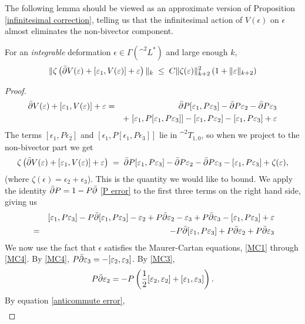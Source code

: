 \documentclass{article}
\begin{document}
The following lemma should be viewed as an approximate version of Proposition \ref{infinitesimal correction}, telling us that the infinitesimal action of $V(\epsilon)$ on $\epsilon$ almost eliminates the non-bivector component.
\begin{lem}\label{almost infinitesimal}
For an \emph{integrable} deformation $\epsilon \in \Gamma(\^ ^2 L^*)$ and large enough $k$,
$$\|\zeta\left(\bar{\partial} V(\varepsilon) + [\varepsilon_1,V(\varepsilon)] + \varepsilon\right)\|_k \;\leq\; C \|\zeta(\varepsilon)\|_{k+2}^2 \, (1 + \|\varepsilon\|_{k+2})$$
\end{lem}
\begin{proof}
\begin{eqnarray*}
\bar{\partial} V(\varepsilon) + [\varepsilon_1,V(\varepsilon)] + \varepsilon &=&
\bar{\partial} P[\varepsilon_1,P\varepsilon_3] - \bar{\partial} P\varepsilon_2 - \bar{\partial} P\varepsilon_3 \\
& & +\; [\varepsilon_1,P[\varepsilon_1,P\varepsilon_3]] - [\varepsilon_1,P\varepsilon_2] - [\varepsilon_1,P\varepsilon_3] + \varepsilon
\end{eqnarray*}
The terms $[\epsilon_1,P\epsilon_2]$ and $[\epsilon_1,P[\epsilon_1,P\epsilon_3]]$ lie in $\^ ^2 T_{1,0}$, so when we project to the non-bivector part we get
$$\zeta\left(\bar{\partial} V(\varepsilon) + [\varepsilon_1,V(\varepsilon)] + \varepsilon\right) \;=\;
\bar{\partial} P[\varepsilon_1,P\varepsilon_3] - \bar{\partial} P\varepsilon_2 - \bar{\partial} P\varepsilon_3
- [\varepsilon_1,P\varepsilon_3] + \zeta(\varepsilon),$$
(where $\zeta(\epsilon) = \epsilon_2 + \epsilon_3$).  This is the quantity we would like to bound.  We apply the identity $\bar{\partial} P = 1 - P \bar{\partial}$ \eqref{P error} to the first three terms on the right hand side, giving us
\begin{eqnarray}
& & [\epsilon_1,P\epsilon_3] - P\bar\del[\epsilon_1,P\epsilon_3] - \epsilon_2 + P\bar\del\epsilon_2 - \epsilon_3 + P\bar\del\epsilon_3 - [\epsilon_1,P\epsilon_3] + \epsilon \notag \\
&=& -P\bar\del[\epsilon_1,P\epsilon_3] + P\bar\del\epsilon_2 + P\bar\del\epsilon_3 \label{error 1}
\end{eqnarray}
We now use the fact that $\epsilon$ satisfies the Maurer-Cartan equations, \eqref{MC1} through \eqref{MC4}.  By \eqref{MC4}, $P\bar{\partial}\varepsilon_3 = -[\varepsilon_2,\varepsilon_3]$.  By \eqref{MC3},
\begin{equation}\label{term 1}
P\bar\del\epsilon_2 = -P\left( \frac{1}{2} [\epsilon_2,\epsilon_2] + [\epsilon_1,\epsilon_3] \right).
\end{equation}
By equation \eqref{anticommute error},
\begin{eqnarray}

\end{eqnarray}
\end{proof}
\end{document}
